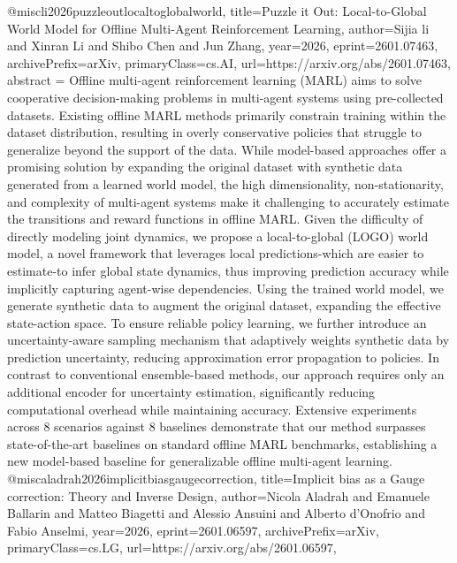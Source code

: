 {}@misc{li2026puzzleoutlocaltoglobalworld,
      title={Puzzle it Out: Local-to-Global World Model for Offline Multi-Agent Reinforcement Learning}, 
      author={Sijia li and Xinran Li and Shibo Chen and Jun Zhang},
      year={2026},
      eprint={2601.07463},
      archivePrefix={arXiv},
      primaryClass={cs.AI},
      url={https://arxiv.org/abs/2601.07463},
      abstract = {Offline multi-agent reinforcement learning (MARL) aims to solve cooperative decision-making problems in multi-agent systems using pre-collected datasets. Existing offline MARL methods primarily constrain training within the dataset distribution, resulting in overly conservative policies that struggle to generalize beyond the support of the data. While model-based approaches offer a promising solution by expanding the original dataset with synthetic data generated from a learned world model, the high dimensionality, non-stationarity, and complexity of multi-agent systems make it challenging to accurately estimate the transitions and reward functions in offline MARL. Given the difficulty of directly modeling joint dynamics, we propose a local-to-global (LOGO) world model, a novel framework that leverages local predictions-which are easier to estimate-to infer global state dynamics, thus improving prediction accuracy while implicitly capturing agent-wise dependencies. Using the trained world model, we generate synthetic data to augment the original dataset, expanding the effective state-action space. To ensure reliable policy learning, we further introduce an uncertainty-aware sampling mechanism that adaptively weights synthetic data by prediction uncertainty, reducing approximation error propagation to policies. In contrast to conventional ensemble-based methods, our approach requires only an additional encoder for uncertainty estimation, significantly reducing computational overhead while maintaining accuracy. Extensive experiments across 8 scenarios against 8 baselines demonstrate that our method surpasses state-of-the-art baselines on standard offline MARL benchmarks, establishing a new model-based baseline for generalizable offline multi-agent learning.}
}@misc{aladrah2026implicitbiasgaugecorrection,
      title={Implicit bias as a Gauge correction: Theory and Inverse Design}, 
      author={Nicola Aladrah and Emanuele Ballarin and Matteo Biagetti and Alessio Ansuini and Alberto d'Onofrio and Fabio Anselmi},
      year={2026},
      eprint={2601.06597},
      archivePrefix={arXiv},
      primaryClass={cs.LG},
      url={https://arxiv.org/abs/2601.06597},
}
